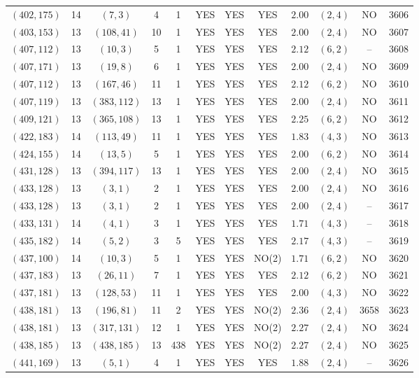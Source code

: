 \begin{longtable}{|c|c|c|c|c|c|c|c|c|c|c|c|}
$(402,175)$ & 14 & $(7,3)$ & 4 & 1 & YES & YES & YES & $2.00$ & $(2,4)$ & NO & 3606\\
$(403,153)$ & 13 & $(108,41)$ & 10 & 1 & YES & YES & YES & $2.00$ & $(2,4)$ & NO & 3607\\
$(407,112)$ & 13 & $(10,3)$ & 5 & 1 & YES & YES & YES & $2.12$ & $(6,2)$ & -- & 3608\\
$(407,171)$ & 13 & $(19,8)$ & 6 & 1 & YES & YES & YES & $2.00$ & $(2,4)$ & NO & 3609\\
$(407,112)$ & 13 & $(167,46)$ & 11 & 1 & YES & YES & YES & $2.12$ & $(6,2)$ & NO & 3610\\
$(407,119)$ & 13 & $(383,112)$ & 13 & 1 & YES & YES & YES & $2.00$ & $(2,4)$ & NO & 3611\\
$(409,121)$ & 13 & $(365,108)$ & 13 & 1 & YES & YES & YES & $2.25$ & $(6,2)$ & NO & 3612\\
$(422,183)$ & 14 & $(113,49)$ & 11 & 1 & YES & YES & YES & $1.83$ & $(4,3)$ & NO & 3613\\
$(424,155)$ & 14 & $(13,5)$ & 5 & 1 & YES & YES & YES & $2.00$ & $(6,2)$ & NO & 3614\\
$(431,128)$ & 13 & $(394,117)$ & 13 & 1 & YES & YES & YES & $2.00$ & $(2,4)$ & NO & 3615\\
$(433,128)$ & 13 & $(3,1)$ & 2 & 1 & YES & YES & YES & $2.00$ & $(2,4)$ & NO & 3616\\
$(433,128)$ & 13 & $(3,1)$ & 2 & 1 & YES & YES & YES & $2.00$ & $(2,4)$ & -- & 3617\\
$(433,131)$ & 14 & $(4,1)$ & 3 & 1 & YES & YES & YES & $1.71$ & $(4,3)$ & -- & 3618\\
$(435,182)$ & 14 & $(5,2)$ & 3 & 5 & YES & YES & YES & $2.17$ & $(4,3)$ & -- & 3619\\
$(437,100)$ & 14 & $(10,3)$ & 5 & 1 & YES & YES & NO(2) & $1.71$ & $(6,2)$ & NO & 3620\\
$(437,183)$ & 13 & $(26,11)$ & 7 & 1 & YES & YES & YES & $2.12$ & $(6,2)$ & NO & 3621\\
$(437,181)$ & 13 & $(128,53)$ & 11 & 1 & YES & YES & YES & $2.00$ & $(4,3)$ & NO & 3622\\
$(438,181)$ & 13 & $(196,81)$ & 11 & 2 & YES & YES & NO(2) & $2.36$ & $(2,4)$ & 3658 & 3623\\
$(438,181)$ & 13 & $(317,131)$ & 12 & 1 & YES & YES & NO(2) & $2.27$ & $(2,4)$ & NO & 3624\\
$(438,185)$ & 13 & $(438,185)$ & 13 & 438 & YES & YES & NO(2) & $2.27$ & $(2,4)$ & NO & 3625\\
$(441,169)$ & 13 & $(5,1)$ & 4 & 1 & YES & YES & YES & $1.88$ & $(2,4)$ & -- & 3626\\

\end{longtable}
